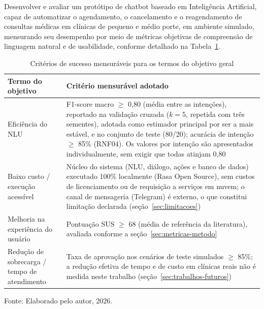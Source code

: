 \documentclass[12pt,a4paper]{extarticle}
\begin{document}

Desenvolver e avaliar um protótipo de chatbot baseado em Inteligência Artificial, capaz de automatizar o agendamento, o cancelamento e o reagendamento de consultas médicas em clínicas de pequeno e médio porte, em ambiente simulado, mensurando seu desempenho por meio de métricas objetivas de compreensão de linguagem natural e de usabilidade, conforme detalhado na Tabela~\ref{tab:criterios-sucesso}.

\begin{table}[H]
\centering
\caption{Critérios de sucesso mensuráveis para os termos do objetivo geral}
\label{tab:criterios-sucesso}
\begin{tabular}{p{3.5cm}p{9.5cm}}
\hline
\textbf{Termo do objetivo} & \textbf{Critério mensurável adotado} \\
\hline
Eficiência do NLU & F1-score macro $\geq$ 0,80 (média entre as intenções), reportado na validação cruzada ($k=5$, repetida com três sementes), adotada como estimador principal por ser a mais estável, e no conjunto de teste (80/20); acurácia de intenção $\geq$ 85\% (RNF04). Os valores por intenção são apresentados individualmente, sem exigir que todas atinjam 0,80 \\
Baixo custo / execução acessível & Núcleo do sistema (NLU, diálogo, ações e banco de dados) executado 100\% localmente (Rasa Open Source), sem custos de licenciamento ou de requisição a serviços em nuvem; o canal de mensageria (Telegram) é externo, o que constitui limitação declarada (seção~\ref{sec:limitacoes}) \\
Melhoria na experiência do usuário & Pontuação SUS $\geq$ 68 (média de referência da literatura), avaliada conforme a seção~\ref{sec:metricas-metodo} \\
Redução de sobrecarga / tempo de atendimento & Taxa de aprovação nos cenários de teste simulados $\geq$ 85\%; a redução efetiva de tempo e de custo em clínicas reais não é medida neste trabalho (seção~\ref{sec:trabalhos-futuros}) \\
\hline
\end{tabular}
\vspace{0.3cm}

\footnotesize{Fonte: Elaborado pelo autor, 2026.}
\end{table}
\end{document}
